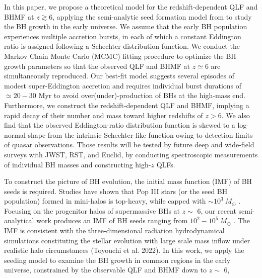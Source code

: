 \documentclass[twocolumn, twocolappendix]{aastex63}
\newcommand{\Msun}{M_\odot}
\begin{document}
\begin{CJK*}{UTF8}{gbsn}
In this paper, we propose a theoretical model for the redshift-dependent QLF and BHMF at $z\gtrsim 6$,
applying the semi-analytic seed formation model from \cite{2021ApJ...917...60L} to study the BH growth in the early universe.
We assume that the early BH population experiences multiple accretion bursts, in each of which a constant Eddington ratio is assigned 
following a Schechter distribution function. 
We conduct the Markov Chain Monte Carlo (MCMC) fitting procedure to optimize the BH growth parameters 
so that the observed QLF and BHMF at $z\simeq 6$ are simultaneously reproduced. 
Our best-fit model suggests several episodes of modest super-Eddington accretion and requires
individual burst durations of $\simeq 20-30$ Myr to avoid over(under)-production of BHs at the high-mass end.
Furthermore, we construct the redshift-dependent QLF and BHMF, implying a rapid decay of 
their number and mass toward higher redshifts of $z>6$.
We also find that the observed Eddington-ratio distribution function is skewed to a log-normal shape from the intrinsic Schechter-like function
owing to detection limits of quasar observations.
Those results will be tested by future deep and wide-field surveys with JWST, RST, and Euclid,
by conducting spectroscopic measurements of individual BH masses and constructing high-$z$ QLFs.  



To construct the picture of BH evolution, the initial mass function (IMF) of BH seeds is required.
Studies have shown that Pop III stars (or the seed BH population) formed in mini-halos is top-heavy, while capped with $\sim 10^3~\Msun$ 
\citep{2014ApJ...781...60H,2015MNRAS.448..568H}.
Focusing on the progenitor halos of supermassive BHs at $z\sim$ 6, 
our recent semi-analytical work produces an IMF of BH seeds ranging from $10^2-10^5~\Msun$ \citep{2021ApJ...917...60L}. 
The IMF is consistent with the three-dimensional radiation hydrodynamical simulations 
constituting the stellar evolution with large scale mass inflow under realistic halo circumstances (Toyouchi et al. 2022).
In this work, we apply the seeding model to examine the BH growth in common regions in the early universe, 
constrained by the observable QLF and BHMF down to $z\sim$ 6, 
\fi




\end{CJK*}
\end{document}
